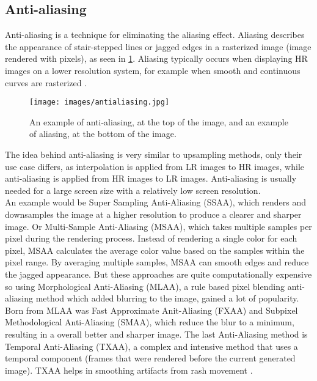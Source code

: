 \documentclass[letterpaper, 10 pt, conference]{ieeeconf}  %
\begin{document}
\subsection{Anti-aliasing}

Anti-aliasing is a technique for eliminating the aliasing effect. 
Aliasing describes the appearance of stair-stepped lines or jagged edges in a rasterized image (image rendered with pixels), as seen in \ref{fig:antiAliasing}.
Aliasing typically occurs when displaying HR images on a lower resolution system, for example when smooth and continuous curves are rasterized \cite{antialiasing_def}.

\begin{figure}[!ht]
        \caption{An example of anti-aliasing, at the top of the image, and an example of aliasing, at the bottom of the image.}
        \centering
        \texttt{[image: images/antialiasing.jpg]}
        \label{fig:antiAliasing}
    \end{figure}

The idea behind anti-aliasing is very similar to upsampling methods, only their use case differs, as interpolation is applied from LR images to HR images, while anti-aliasing is applied from HR images to LR images.
Anti-aliasing is usually needed for a large screen size with a relatively low screen resolution.\\
An example would be Super Sampling Anti-Aliasing (SSAA), which renders and downsamples the image at a higher resolution to produce a clearer and sharper image. 
Or Multi-Sample Anti-Aliasing (MSAA), which takes multiple samples per pixel during the rendering process. 
Instead of rendering a single color for each pixel, MSAA calculates the average color value based on the samples within the pixel range. 
By averaging multiple samples, MSAA can smooth edges and reduce the jagged appearance.
But these approaches are quite computationally expensive so using Morphological Anti-Aliasing (MLAA), a rule based pixel blending anti-aliasing method which added blurring to the image, gained a lot of popularity. 
Born from MLAA was Fast Approximate Anit-Aliasing (FXAA) and Subpixel Methodological Anti-Aliasing (SMAA), which reduce the blur to a minimum, resulting in a overall better and sharper image.
The last Anti-Aliasing method is Temporal Anti-Aliasing (TXAA), a complex and intensive method that uses a temporal component (frames that were rendered before the current generated image). 
TXAA helps in smoothing artifacts from rash movement \cite{antialiasing_types} \cite{gu2022super} \cite{stuttgart_boy}.\\
\end{document}
